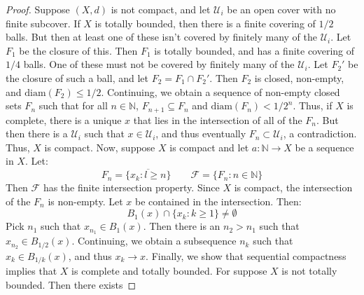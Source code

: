         \begin{proof}
            Suppose $(X,d)$ is not compact, and let
            $\mathcal{U}_{i}$ be an open cover with no finite
            subcover. If $X$ is totally bounded, then there is a
            finite covering of $1/2$ balls. But then at least
            one of these isn't covered by finitely many of the
            $\mathcal{U}_{i}$. Let $F_{1}$ be the closure of
            this. Then $F_{1}$ is totally bounded, and has
            a finite covering of $1/4$ balls. One of these
            must not be covered by finitely many of the
            $\mathcal{U}_{i}$. Let $F_{2}'$ be the closure
            of such a ball, and let $F_{2}=F_{1}\cap{F}_{2}'$.
            Then $F_{2}$ is closed, non-empty, and
            $\mathrm{diam}(F_{2})\leq{1/2}$. Continuing, we
            obtain a sequence of non-empty closed sets
            $F_{n}$ such that for all $n\in\mathbb{N}$,
            $F_{n+1}\subseteq{F}_{n}$ and
            $\mathrm{diam}(F_{n})<1/2^{n}$. Thus, if $X$ is complete,
            there is a unique $x$ that lies in the intersection
            of all of the $F_{n}$. But then there is a
            $\mathcal{U}_{i}$ such that $x\in\mathcal{U}_{i}$,
            and thus eventually $F_{n}\subset\mathcal{U}_{i}$,
            a contradiction. Thus, $X$ is compact. Now, suppose
            $X$ is compact and let $a:\mathbb{N}\rightarrow{X}$
            be a sequence in $X$. Let:
            \begin{equation}
                F_{n}=\overline{\{x_{k}:l\geq{n}\}}
                \quad\quad
                \mathscr{F}=\{F_{n}:n\in\mathbb{N}\}
            \end{equation}
            Then $\mathscr{F}$ has the finite intersection
            property. Since $X$ is compact, the intersection of
            the $F_{n}$ is non-empty. Let $x$ be contained in
            the intersection. Then:
            \begin{equation}
                B_{1}(x)\cap\{x_{k}:k\geq{1}\}\ne\emptyset
            \end{equation}
            Pick $n_{1}$ such that $x_{n_{1}}\in{B}_{1}(x)$.
            Then there is an $n_{2}>n_{1}$ such that
            $x_{n_{2}}\in{B}_{1/2}(x)$. Continuing, we obtain
            a subsequence $n_{k}$ such that
            $x_{k}\in{B}_{1/k}(x)$, and thus
            $x_{k}\rightarrow{x}$. Finally, we show that
            sequential compactness implies that $X$ is
            complete and totally bounded. For suppose $X$ is
            not totally bounded. Then there exists

\end{proof}
